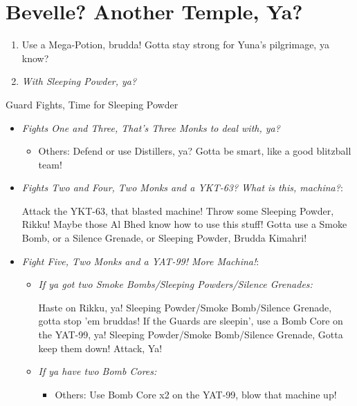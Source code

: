 \chapter{Bevelle? Another Temple, Ya?}
\begin{enumerate}
\item Use a Mega-Potion, brudda! Gotta stay strong for Yuna's pilgrimage, ya know?
\item \textit{With Sleeping Powder, ya?}
\end{enumerate}
\begin{battle}{Guard Fights, Time for Sleeping Powder}
\begin{itemize}
\item \textit{Fights One and Three, That's Three Monks to deal with, ya?}
\begin{itemize}
\tidusf Attack 'em, Tidus! Show 'em what ya got!
\item Others: Defend or use Distillers, ya? Gotta be smart, like a good blitzball team!
\end{itemize}
\item \textit{Fights Two and Four, Two Monks and a YKT-63? What is this, machina?}:
\begin{itemize}
\tidusf Attack the YKT-63, that blasted machine!
\rikkuf Throw some Sleeping Powder, Rikku! Maybe those Al Bhed know how to use this stuff!
\kimahrif Gotta use a Smoke Bomb, or a Silence Grenade, or Sleeping Powder, Brudda Kimahri!
\end{itemize}
\item \textit{Fight Five, Two Monks and a YAT-99! More Machina!}:
\begin{itemize}
\item \textit{If ya got two Smoke Bombs/Sleeping Powders/Silence Grenades:}
\begin{itemize}
\tidusf Haste on Rikku, ya!
\rikkuf Sleeping Powder/Smoke Bomb/Silence Grenade, gotta stop 'em bruddas!
\rikkuf If the Guards are sleepin', use a Bomb Core on the YAT-99, ya!
\rikkuf Sleeping Powder/Smoke Bomb/Silence Grenade, Gotta keep them down!
\tidusf Attack, Ya!
\end{itemize}
\item \textit{If ya have two Bomb Cores:}
\begin{itemize}
\tidusf Attack the Monks, Ya!
\item Others: Use Bomb Core x2 on the YAT-99, blow that machine up!
\end{itemize}
\end{itemize}
\end{itemize}
\end{battle}
